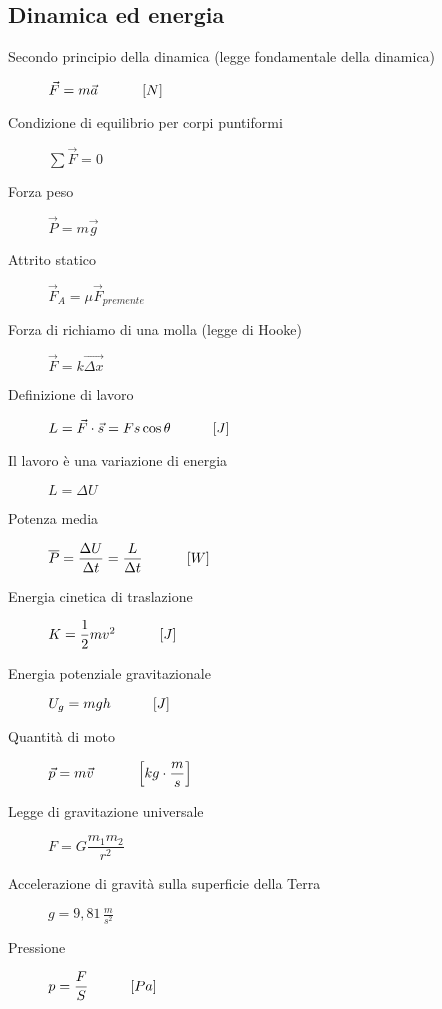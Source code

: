 \documentclass[a4paper,11pt,italian]{article}
\begin{document}
\subsection{Dinamica ed energia}
\begin{description}
  \item[Secondo principio della dinamica (legge fondamentale della dinamica)] 
  $ \vec{F} = m  \vec{a}   \hspace*{3em} \left[ N \right]  $
  
  
  \item[Condizione di equilibrio per corpi puntiformi]
  $ \sum\vec{F} = 0 $
  
  \item[Forza peso] 
  $ \vec{P} = m \vec{g} $
  
  \item[Attrito statico] 
  
  $ \vec{F}_{A} = \mu \vec{F}_{premente} $
  
  \item[Forza di richiamo di una molla (legge di Hooke)]
  $ \vec{F} = k \vec{\Delta x} $
  
  \item[Definizione di lavoro] 
  $ L = \vec{F} \cdot \vec{s} = F s \cos\theta \hspace*{3em} [J]  $

  \item[Il lavoro è una variazione di energia] 
  $ L = \Delta U $
  
  \item[Potenza media] 
  $ \overline{P} = \dfrac{\Delta U}{\Delta t} = \dfrac{L}{\Delta t} \hspace*{3em} \left[ W \right] $
  
  
  \item[Energia cinetica di traslazione] 
  $ K = \dfrac{1}{2} mv^2 \hspace*{3em} \left[ J \right]$
  
  \item[Energia potenziale gravitazionale] 
  $ U_g = mgh \hspace*{3em} [J] $
  
  \item[Quantità di moto] 
  $ \vec{p} = m \vec{v} \hspace*{3em} \left[ kg \cdot \dfrac{m}{s} \right] $ 
  
  \item[Legge di gravitazione universale] 
  $ F = G \dfrac{m_1 m_2}{r^2} $
  
  \item[Accelerazione di gravità sulla superficie della Terra] 
$ g =  9, 81 \, \frac{m}{s^2} $

  \item[Pressione] 
$ p = \dfrac{F}{S} \hspace*{3em} [Pa]$
\end{description}
   
\end{document}
